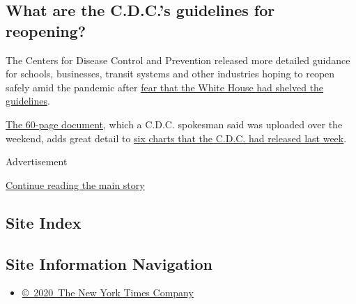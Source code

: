 \hypertarget{what-are-the-cdcs-guidelines-for-reopening}{%
\subsection{What are the C.D.C.'s guidelines for
reopening?}\label{what-are-the-cdcs-guidelines-for-reopening}}

The Centers for Disease Control and Prevention released more detailed
guidance for schools, businesses, transit systems and other industries
hoping to reopen safely amid the pandemic after
\href{https://www.nytimes.com/2020/05/07/us/politics/trump-cdc.html}{fear
that the White House had shelved the guidelines}.

\href{https://www.cdc.gov/coronavirus/2019-ncov/downloads/php/CDC-Activities-Initiatives-for-COVID-19-Response.pdf}{The
60-page document}, which a C.D.C. spokesman said was uploaded over the
weekend, adds great detail to
\href{https://www.nytimes.com/2020/05/15/us/cdc-coronavirus-checklists-decision-trees.html}{six
charts that the C.D.C. had released last week}.

Advertisement

\protect\hyperlink{after-bottom}{Continue reading the main story}

\hypertarget{site-index}{%
\subsection{Site Index}\label{site-index}}

\hypertarget{site-information-navigation}{%
\subsection{Site Information
Navigation}\label{site-information-navigation}}

\begin{itemize}
\tightlist
\item
  \href{https://help.nytimes.com/hc/en-us/articles/115014792127-Copyright-notice}{©~2020~The
  New York Times Company}
\end{itemize}

